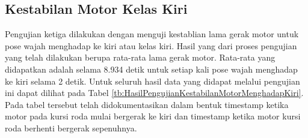 \subsection{Kestabilan Motor Kelas Kiri}
Pengujian ketiga dilakukan dengan menguji kestablian lama gerak motor untuk pose wajah menghadap ke kiri atau kelas kiri. Hasil yang dari proses pengujian yang telah dilakukan berupa rata-rata lama gerak motor. Rata-rata yang didapatkan adalah selama 8.934 detik untuk setiap kali pose wajah menghadap ke kiri selama 2 detik. Untuk seluruh hasil data yang didapat melalui pengujian ini dapat dilihat pada Tabel \ref{tb:HasilPengujianKestabilanMotorMenghadapKiri}. Pada tabel tersebut telah didokumentasikan dalam bentuk timestamp ketika motor pada kursi roda mulai bergerak ke kiri dan timestamp ketika motor kursi roda berhenti bergerak sepenuhnya.

